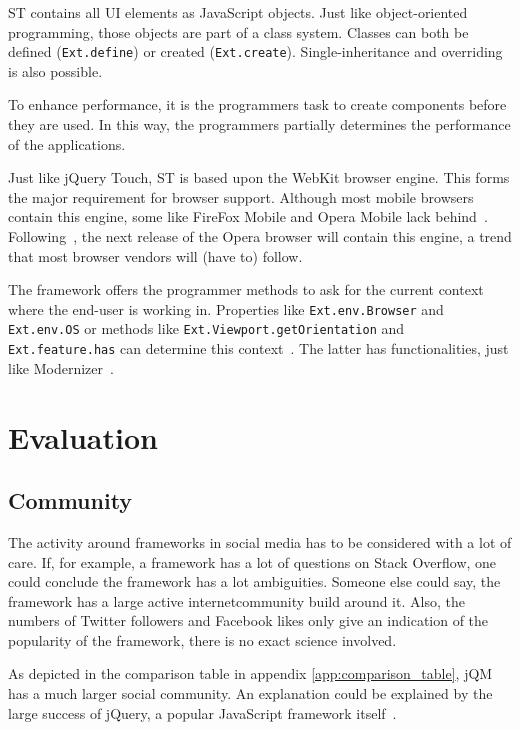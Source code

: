 \documentclass[a4paper]{artikel3}
\newcommand{\code}[1]{\texttt{#1}}
\renewcommand{\paragraph}[1]{\vspace{2mm} \noindent {\bf #1}  }
\begin{document}
ST contains all UI elements as JavaScript objects.  
Just like object-oriented programming,  those objects are part of a class system.  
Classes can both be defined (\code{Ext.define}) or created (\code{Ext.create}).  
Single-inheritance and overriding is also possible.    

To enhance performance,  it is the programmers task to create components before they are used.  
In this way,  the programmers partially determines the performance of the applications.

\paragraph{Browser support}
Just like jQuery Touch,  ST is based upon the WebKit browser engine.  
This forms the major requirement for browser support.  
Although most mobile browsers contain this engine,  some like FireFox Mobile and Opera Mobile lack behind~\cite{JohnEClark2012}.  
Following~\cite{Wokke2013}, the next release of the Opera browser will contain this engine,  a trend that most browser vendors will (have to) follow.

The framework offers the programmer methods to ask for the current context where the end-user is working in. 
Properties like \code{Ext.env.Browser} and \code{Ext.env.OS} or methods like \code{Ext.Viewport.getOrientation} and \code{Ext.feature.has} can determine this context~\cite{JohnEClark2012}.  
The latter has functionalities,  just like Modernizer~\cite{Modernizr2012}.  

\section{Evaluation}

\subsection{Community} %
\label{sec:community}

The activity around frameworks in social media has to be considered with a lot of care.  
If,  for example,  a framework has a lot of questions on Stack Overflow,  one could conclude the framework has a lot ambiguities.  
Someone else could say,  the framework has a large active internetcommunity build around it.  
Also,  the numbers of Twitter followers and Facebook likes only give an indication of the popularity of the framework,  there is no exact science involved.

As depicted in the comparison table in appendix \ref{app:comparison_table},  jQM has a much larger social community.  
An explanation could be explained by the large success of jQuery,  a popular JavaScript framework itself~\cite{Hales2012}.
\end{document}
